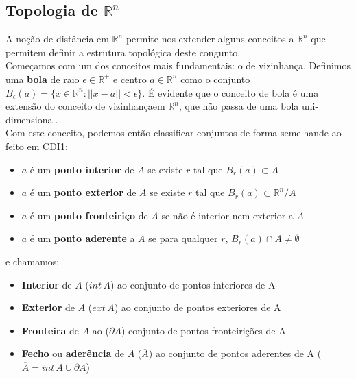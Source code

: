 \documentclass{article}
\newcommand{\R}{\mathbb{R}}
\begin{document}
\subsection{Topologia de $\R^n$}
A noção de distância em $\R^n$ permite-nos extender alguns conceitos a $\R^n$ que permitem definir a estrutura topológica deste congunto.\\
Começamos com um dos conceitos mais fundamentais: o de vizinhança. Definimos uma \textbf{bola} de raio $\epsilon \in \R^+$ e centro $a \in \R^n$ como o conjunto $B_\epsilon(a) = \{ x \in \R^n : ||x-a|| < \epsilon \}$. É evidente que o conceito de bola é uma extensão do conceito de vizinhançaem $\R^n$, que não passa de uma bola uni-dimensional.\\
Com este conceito, podemos então classificar conjuntos de forma semelhande ao feito em CDI1:
\begin{itemize}
\item $a$ é um \textbf{ponto interior} de $A$ se existe $r$ tal que $B_r(a) \subset A$ \vspace{-0.8mm}
\item $a$ é um \textbf{ponto exterior} de $A$ se existe $r$ tal que $B_r(a) \subset \R^n/A$ \vspace{-0.8mm}
\item $a$ é um \textbf{ponto fronteiriço} de $A$ se não é interior nem exterior a $A$ \vspace{-0.8mm}
\item $a$ é um \textbf{ponto aderente} a $A$ se para qualquer $r$, $B_r(a) \cap A \neq \emptyset$ \vspace{-0.8mm}
\end{itemize}
e chamamos: \vspace{-0.8mm}
\begin{itemize}
\item \textbf{Interior} de $A$ ($int \, A$) ao conjunto de pontos interiores de A \vspace{-0.8mm}
\item \textbf{Exterior} de $A$ ($ext \, A$) ao conjunto de pontos exteriores de A \vspace{-0.8mm}
\item \textbf{Fronteira} de $A$ ao ($\partial A$) conjunto de pontos fronteirições de A \vspace{-0.8mm}
\item \textbf{Fecho} ou \textbf{aderência} de $A$ ($\overline{A}$) ao conjunto de pontos aderentes de A ($\overline{A}=int \, A \cup \partial A$) \vspace{-0.8mm}
\end{itemize}
\end{document}
